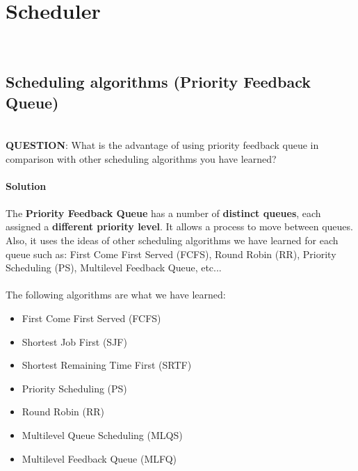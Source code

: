 \documentclass[a4paper]{article}
\begin{document}

\newpage
\tableofcontents
\newpage



\section{Scheduler}
    \\
	\subsection{Scheduling algorithms (Priority Feedback Queue)}
	\hfill\\
	{\bfseries QUESTION}: What is the advantage of using priority feedback queue in comparison with other scheduling algorithms you have learned?\\
	\\
	\textbf{Solution} \\
	\\
	The \textbf{Priority Feedback Queue} has a number of \textbf{distinct queues}, each
    assigned a \textbf{different priority level}. It allows
    a process to move between queues. Also, it uses the ideas of other scheduling algorithms we have learned for each queue such as: First Come First Served (FCFS), Round Robin (RR), Priority Scheduling (PS),  Multilevel Feedback Queue, etc...\\
    \\
    The following algorithms are what we have learned:\\
    \begin{itemize}
        \item First Come First Served (FCFS)
        \item Shortest Job First (SJF)
        \item Shortest Remaining Time First (SRTF)
        \item Priority Scheduling (PS)
        \item Round Robin (RR)
        \item Multilevel Queue Scheduling (MLQS)
        \item Multilevel Feedback Queue (MLFQ)
    \end{itemize}
\end{document}
